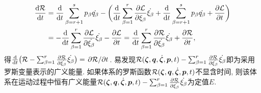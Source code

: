\begin{align*}
    \dv{\mathcal{R}}{t} &= \dv{t} \sum_{\beta=r+1}^s p_{\beta}\dot{q_{\beta}} - \bigg(\dv{t} \sum_{\beta=1}^r \pdv{\mathcal{L}}{\xi_{\beta}} \dot{\xi_{\beta}} + \dv{t} \sum_{\beta=r+1}^s p_{\beta} \dot{q_{\beta}} + \pdv{\mathcal{L}}{t}\bigg) \\
    &= -\dv{t} \sum_{\beta=1}^r \pdv{\mathcal{L}}{\dot{\xi_{\beta}}} \dot{\xi_{\beta}} - \pdv{\mathcal{L}}{t} = \dv{t} \sum_{\beta=1}^r \pdv{\mathcal{R}}{\dot{\xi_{\beta}}} \dot{\xi_{\beta}} + \pdv{\mathcal{R}}{t},
\end{align*}
得$ \dv{t} \big(\mathcal{R} - \sum_{\beta=1}^r \pdv{\mathcal{R}}{\dot{\xi_{\beta}}}\dot{\xi_{\beta}}\big) = \pdv*{\mathcal{R}}{t} $. 易发现$ \mathcal{R}(\vb*{\zeta},\vb*{q},\dot{\vb*{\zeta}},\vb*{p},t) - \sum_{\beta=1}^r \pdv{\mathcal{R}}{\dot{\xi_{\beta}}}\dot{\xi_{\beta}} $即为采用罗斯变量表示的广义能量. 如果体系的罗斯函数$ \mathcal{R}(\vb*{\zeta},\vb*{q},\dot{\vb*{\zeta}},\vb*{p},t) $不显含时间, 则该体系在运动过程中恒有广义能量$ \mathcal{R}(\vb*{\zeta},\vb*{q},\dot{\vb*{\zeta}},\vb*{p},t) - \sum_{\beta=1}^r \pdv{\mathcal{R}}{\dot{\xi_{\beta}}}\dot{\xi_{\beta}} $为定值$ E $.

